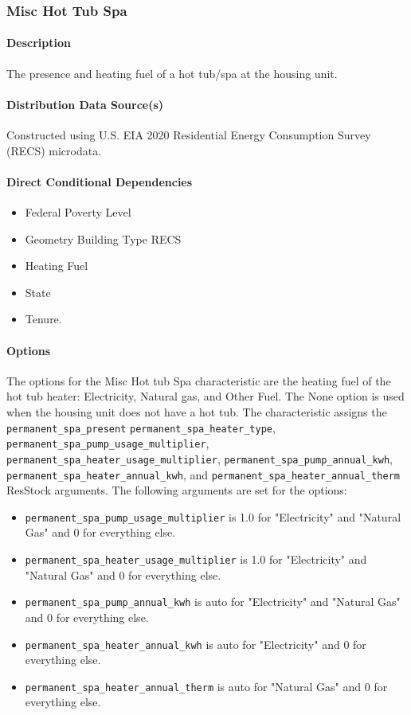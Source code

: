 \subsubsection{Misc Hot Tub Spa}
\paragraph{Description}
The presence and heating fuel of a hot tub/spa at the housing unit.

\paragraph{Distribution Data Source(s)}
Constructed using U.S. EIA 2020 Residential Energy Consumption Survey (RECS) microdata. 

\paragraph{Direct Conditional Dependencies}
\begin{itemize}
    \item Federal Poverty Level
    \item Geometry Building Type RECS
    \item Heating Fuel
    \item State
    \item Tenure.
\end{itemize}

\paragraph{Options}
The options for the Misc Hot tub Spa characteristic are the heating fuel of the hot tub heater: Electricity, Natural gas, and Other Fuel. The None option is used when the housing unit does not have a hot tub. The characteristic assigns the \texttt{permanent\_spa\_present} \texttt{permanent\_spa\_heater\_type}, \texttt{permanent\_spa\_pump\_usage\_multiplier}, \texttt{permanent\_spa\_heater\_usage\_multiplier}, \texttt{permanent\_spa\_pump\_annual\_kwh}, \texttt{permanent\_spa\_heater\_annual\_kwh}, and \texttt{permanent\_spa\_heater\_annual\_therm} ResStock arguments. The following arguments are set for the options: 

\begin{itemize}
    \item \texttt{permanent\_spa\_pump\_usage\_multiplier} is 1.0 for "Electricity" and "Natural Gas" and 0 for everything else.
    \item \texttt{permanent\_spa\_heater\_usage\_multiplier} is 1.0 for "Electricity" and "Natural Gas" and 0 for everything else.
    \item \texttt{permanent\_spa\_pump\_annual\_kwh} is auto for "Electricity" and "Natural Gas" and 0 for everything else.
    \item \texttt{permanent\_spa\_heater\_annual\_kwh} is auto for "Electricity" and 0 for everything else.
    \item \texttt{permanent\_spa\_heater\_annual\_therm} is auto for "Natural Gas" and 0 for everything else.    
\end{itemize}

